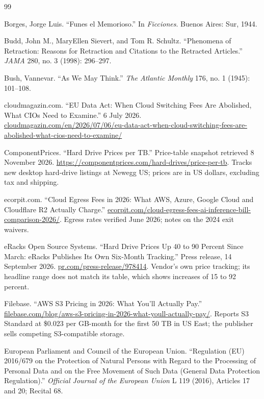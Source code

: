 \documentclass[12pt]{article}
\begin{document}
\begin{thebibliography}{99}

Borges, Jorge Luis. ``Funes el Memorioso.'' In \emph{Ficciones}. Buenos Aires: Sur, 1944.

Budd, John M., MaryEllen Sievert, and Tom R. Schultz. ``Phenomena of Retraction: Reasons for Retraction and Citations to the Retracted Articles.'' \emph{JAMA} 280, no. 3 (1998): 296--297.

Bush, Vannevar. ``As We May Think.'' \emph{The Atlantic Monthly} 176, no. 1 (1945): 101--108.

cloudmagazin.com. ``EU Data Act: When Cloud Switching Fees Are Abolished, What CIOs Need to Examine.'' 6 July 2026. \url{cloudmagazin.com/en/2026/07/06/eu-data-act-when-cloud-switching-fees-are-abolished-what-cios-need-to-examine/}

ComponentPrices. ``Hard Drive Prices per TB.'' Price-table snapshot retrieved 8 November 2026. \url{https://componentprices.com/hard-drives/price-per-tb}. Tracks new desktop hard-drive listings at Newegg US; prices are in US dollars, excluding tax and shipping.

ecorpit.com. ``Cloud Egress Fees in 2026: What AWS, Azure, Google Cloud and Cloudflare R2 Actually Charge.'' \url{ecorpit.com/cloud-egress-fees-ai-inference-bill-comparison-2026/}. Egress rates verified June 2026; notes on the 2024 exit waivers.

eRacks Open Source Systems. ``Hard Drive Prices Up 40 to 90 Percent Since March: eRacks Publishes Its Own Six-Month Tracking.'' Press release, 14 September 2026. \url{pr.com/press-release/978414}. Vendor's own price tracking; its headline range does not match its table, which shows increases of 15 to 92 percent.

Filebase. ``AWS S3 Pricing in 2026: What You'll Actually Pay.'' \url{filebase.com/blog/aws-s3-pricing-in-2026-what-youll-actually-pay/}. Reports S3 Standard at \$0.023 per GB-month for the first 50 TB in US East; the publisher sells competing S3-compatible storage.

European Parliament and Council of the European Union. ``Regulation (EU) 2016/679 on the Protection of Natural Persons with Regard to the Processing of Personal Data and on the Free Movement of Such Data (General Data Protection Regulation).'' \emph{Official Journal of the European Union} L 119 (2016), Articles 17 and 20; Recital 68.


\end{thebibliography}
\end{document}
